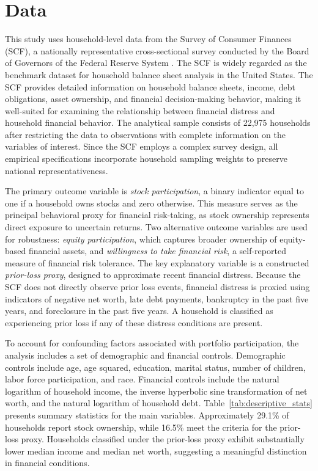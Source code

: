 \documentclass[12pt]{article}
\begin{document}
\section{Data}

This study uses household-level data from the Survey of Consumer Finances (SCF), a nationally representative cross-sectional survey conducted by the Board of Governors of the Federal Reserve System \citep{federalreserve2022scf}. The SCF is widely regarded as the benchmark dataset for household balance sheet analysis in the United States. The SCF provides detailed information on household balance sheets, income, debt obligations, asset ownership, and financial decision-making behavior, making it well-suited for examining the relationship between financial distress and household financial behavior. The analytical sample consists of 22,975 households after restricting the data to observations with complete information on the variables of interest. Since the SCF employs a complex survey design, all empirical specifications incorporate household sampling weights to preserve national representativeness.

\medskip
The primary outcome variable is \textit{stock participation}, a binary indicator equal to one if a household owns stocks and zero otherwise. This measure serves as the principal behavioral proxy for financial risk-taking, as stock ownership represents direct exposure to uncertain returns. Two alternative outcome variables are used for robustness: \textit{equity participation}, which captures broader ownership of equity-based financial assets, and \textit{willingness to take financial risk}, a self-reported measure of financial risk tolerance. The key explanatory variable is a constructed \textit{prior-loss proxy}, designed to approximate recent financial distress. Because the SCF does not directly observe prior loss events, financial distress is proxied using indicators of negative net worth, late debt payments, bankruptcy in the past five years, and foreclosure in the past five years. A household is classified as experiencing prior loss if any of these distress conditions are present.

\medskip
To account for confounding factors associated with portfolio participation, the analysis includes a set of demographic and financial controls. Demographic controls include age, age squared, education, marital status, number of children, labor force participation, and race. Financial controls include the natural logarithm of household income, the inverse hyperbolic sine transformation of net worth, and the natural logarithm of household debt. Table~\ref{tab:descriptive_stats} presents summary statistics for the main variables. Approximately 29.1\% of households report stock ownership, while 16.5\% meet the criteria for the prior-loss proxy. Households classified under the prior-loss proxy exhibit substantially lower median income and median net worth, suggesting a meaningful distinction in financial conditions.
\end{document}
